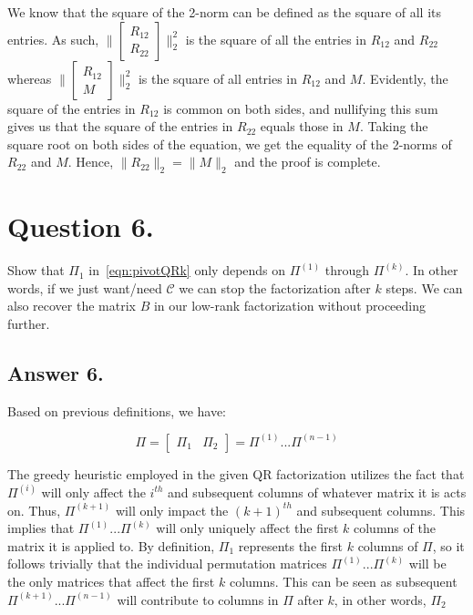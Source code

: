 \documentclass[12pt]{article}
\newcommand{\C}{\mathcal{C}}
\begin{document}
We know that the square of the 2-norm can be defined as the square of all its entries. As such, ${\| \begin{bmatrix}
                R_{12} \\
                R_{22}
            \end{bmatrix} \|^2_2}$ is the square of all the entries in $R_{12}$ and $R_{22}$ whereas ${\| \begin{bmatrix}
                R_{12} \\
                M
            \end{bmatrix} \|^2_2}$ is the square of all entries in $R_{12}$ and $M$. Evidently, the square of the entries in $R_{12}$ is common on both sides, and nullifying this sum gives us that the square of the entries in $R_{22}$ equals those in $M$. Taking the square root on both sides of the equation, we get the equality of the 2-norms of $R_{22}$ and $M$. Hence, $\|R_{22}\|_2 = \|M\|_2$ and the proof is complete.


\section*{Question 6.}
Show that $\Pi_1$ in~\cref{eqn:pivotQRk} only depends on $\Pi^{(1)}$ through $\Pi^{(k)}.$ In other words, if we just want/need $\C$ we can stop the factorization after $k$ steps. We can also recover the matrix $B$ in our low-rank factorization without proceeding further.

\subsection*{Answer 6.}

Based on previous definitions, we have:

$$\Pi = \begin{bmatrix}
        \Pi_1 & \Pi_2
    \end{bmatrix} = \Pi^{(1)} ... \Pi^{(n-1)}$$

The greedy heuristic employed in the given QR factorization utilizes the fact that $\Pi^{(i)}$ will only affect the $i^{th}$ and subsequent columns of whatever matrix it is acts on. Thus, $\Pi^{(k+1)}$ will only impact  the $(k+1)^{th}$ and subsequent columns. This implies that $\Pi^{(1)} ... \Pi^{(k)}$ will only uniquely affect the first $k$ columns of the matrix it is applied to. By definition, $\Pi_1$ represents the first $k$ columns of $\Pi$, so it follows trivially that the individual permutation matrices $\Pi^{(1)} ... \Pi^{(k)}$ will be the only matrices that affect the first $k$ columns. This can be seen as subsequent $\Pi^{(k+1)} ...\Pi^{(n-1)}$ will contribute to columns in $\Pi$ after $k$, in other words, $\Pi_2$
\end{document}

